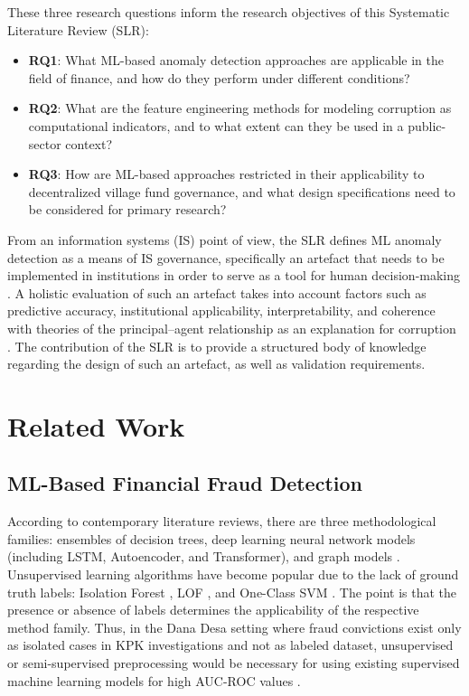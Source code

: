 \documentclass[3p,times,procedia]{elsarticle}
\begin{document}
These three research questions inform the research objectives of this Systematic Literature Review (SLR):
\begin{itemize}
\item \textbf{RQ1}: What ML-based anomaly detection approaches are applicable in the field of finance, and how do they perform under different conditions?
\item \textbf{RQ2}: What are the feature engineering methods for modeling corruption as computational indicators, and to what extent can they be used in a public-sector context?
\item \textbf{RQ3}: How are ML-based approaches restricted in their applicability to decentralized village fund governance, and what design specifications need to be considered for primary research?
\end{itemize}

From an information systems (IS) point of view, the SLR defines ML anomaly detection as a means of IS governance, specifically an artefact that needs to be implemented in institutions in order to serve as a tool for human decision-making \cite{method_hevner2004}. A holistic evaluation of such an artefact takes into account factors such as predictive accuracy, institutional applicability, interpretability, and coherence with theories of the principal–agent relationship as an explanation for corruption \cite{method_jensen1976}. The contribution of the SLR is to provide a structured body of knowledge regarding the design of such an artefact, as well as validation requirements.


\section{Related Work}
\label{sec:related}

\subsection{ML-Based Financial Fraud Detection}

According to contemporary literature reviews, there are three methodological families: ensembles of decision trees, deep learning neural network models (including LSTM, Autoencoder, and Transformer), and graph models \cite{p001,p003,p004,p022,p037}. Unsupervised learning algorithms have become popular due to the lack of ground truth labels: Isolation Forest \cite{p015}, LOF \cite{p041}, and One-Class SVM \cite{p015,p041}. The point is that the presence or absence of labels determines the applicability of the respective method family. Thus, in the Dana Desa setting where fraud convictions exist only as isolated cases in KPK investigations and not as labeled dataset, unsupervised or semi-supervised preprocessing would be necessary for using existing supervised machine learning models for high AUC-ROC values \cite{p003,p007,p022,p026,p039}.
\end{document}
